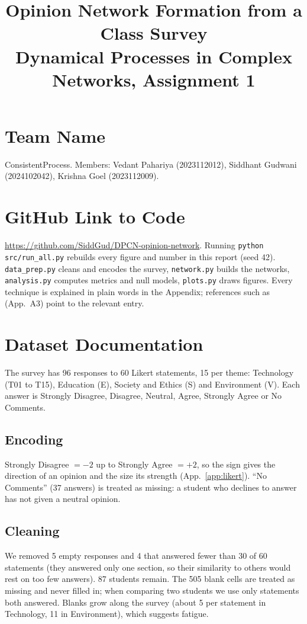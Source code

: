 \documentclass[10pt,a4paper]{article}
\title{\textbf{Opinion Network Formation from a Class Survey}\\ \large Dynamical Processes in Complex Networks, Assignment 1}
\date{}
\newcounter{tech}\renewcommand{\thetech}{A\arabic{tech}}
\newcommand{\app}[1]{(App.~\ref{app:#1})}\setlength{\columnsep}{14pt}
\begin{document}
\maketitle
\vspace{-1.8cm}

\section{Team Name}
ConsistentProcess. Members: Vedant Pahariya (2023112012), Siddhant Gudwani (2024102042), Krishna Goel (2023112009).

\section{GitHub Link to Code}
\url{https://github.com/SiddGud/DPCN-opinion-network}. Running \texttt{python src/run\_all.py} rebuilds every figure and number in this report (seed 42). \texttt{data\_prep.py} cleans and encodes the survey, \texttt{network.py} builds the networks, \texttt{analysis.py} computes metrics and null models, \texttt{plots.py} draws figures. Every technique is explained in plain words in the Appendix; references such as (App.~A3) point to the relevant entry.

\section{Dataset Documentation}
The survey has 96 responses to 60 Likert statements, 15 per theme: Technology (T01 to T15), Education (E), Society and Ethics (S) and Environment (V). Each answer is Strongly Disagree, Disagree, Neutral, Agree, Strongly Agree or No Comments.

\subsection{Encoding}
Strongly Disagree $=-2$ up to Strongly Agree $=+2$, so the sign gives the direction of an opinion and the size its strength \app{likert}. ``No Comments'' (37 answers) is treated as missing: a student who declines to answer has not given a neutral opinion.

\subsection{Cleaning}
We removed 5 empty responses and 4 that answered fewer than 30 of 60 statements (they answered only one section, so their similarity to others would rest on too few answers). 87 students remain. The 505 blank cells are treated as missing and never filled in; when comparing two students we use only statements both answered. Blanks grow along the survey (about 5 per statement in Technology, 11 in Environment), which suggests fatigue.
\end{document}
